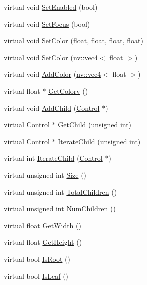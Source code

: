 \begin{CompactItemize}
\item 
virtual void \hyperlink{class_control_6a9b9a9aeef0ede05d1e3a238eab972e}{SetEnabled} (bool)
\item 
virtual void \hyperlink{class_control_5394421a4554421d16c8e9cee70ee861}{SetFocus} (bool)
\item 
virtual void \hyperlink{class_control_54d417ec0a6f98f6a980e88553a89ff3}{SetColor} (float, float, float, float)
\item 
virtual void \hyperlink{class_control_744d8882bf83d7848f5110ad0b9d6a3c}{SetColor} (\hyperlink{classnv_1_1vec4}{nv::vec4}$<$ float $>$)
\item 
virtual void \hyperlink{class_control_1cdbb9fe5cbb9c4d8cf6c1513ae502ac}{AddColor} (\hyperlink{classnv_1_1vec4}{nv::vec4}$<$ float $>$)
\item 
virtual float $\ast$ \hyperlink{class_control_f5e0027ce1780579d4148c214ed97162}{GetColorv} ()
\item 
virtual void \hyperlink{class_control_bb10da20e8fa360c8bd4846a05b782e3}{AddChild} (\hyperlink{class_control}{Control} $\ast$)
\item 
virtual \hyperlink{class_control}{Control} $\ast$ \hyperlink{class_control_3961b1b4e64d6ea03903f2c6e3c16c5a}{GetChild} (unsigned int)
\item 
virtual \hyperlink{class_control}{Control} $\ast$ \hyperlink{class_control_b719c1843ea119e5c137a6a668df8179}{IterateChild} (unsigned int)
\item 
virtual int \hyperlink{class_control_4f0b3da2c0add2bb739ad1c077d88ba8}{IterateChild} (\hyperlink{class_control}{Control} $\ast$)
\item 
virtual unsigned int \hyperlink{class_control_b71295cb3f212dcc92672028155ffb7d}{Size} ()
\item 
virtual unsigned int \hyperlink{class_control_ed5bd5da33b1e7007877a777c2c0eddb}{TotalChildren} ()
\item 
virtual unsigned int \hyperlink{class_control_40b01c0e65c2fec12afb950d3758983f}{NumChildren} ()
\item 
virtual float \hyperlink{class_control_7cf1ac530fbe1807014c89576b1cee5f}{GetWidth} ()
\item 
virtual float \hyperlink{class_control_623c5af26b7c0295285395cdb607caf1}{GetHeight} ()
\item 
virtual bool \hyperlink{class_control_722115b12e4f4c66a1ce8f4fba9c350f}{IsRoot} ()
\item 
virtual bool \hyperlink{class_control_01d8251453924ad80bf6271308b9f6fd}{IsLeaf} ()
\end{CompactItemize}
